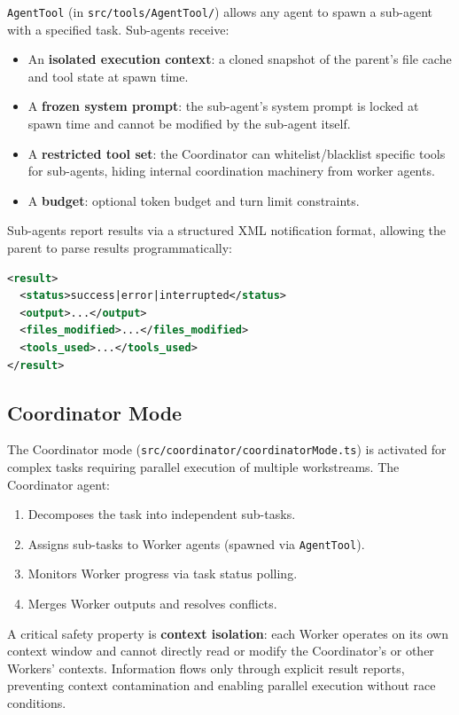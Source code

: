\documentclass{article}
\begin{document}
\texttt{AgentTool} (in \texttt{src/tools/AgentTool/}) allows any agent to spawn a sub-agent with a specified task. Sub-agents receive:
\begin{itemize}
  \item An \textbf{isolated execution context}: a cloned snapshot of the parent's file cache and tool state at spawn time.
  \item A \textbf{frozen system prompt}: the sub-agent's system prompt is locked at spawn time and cannot be modified by the sub-agent itself.
  \item A \textbf{restricted tool set}: the Coordinator can whitelist/blacklist specific tools for sub-agents, hiding internal coordination machinery from worker agents.
  \item A \textbf{budget}: optional token budget and turn limit constraints.
\end{itemize}

Sub-agents report results via a structured XML notification format, allowing the parent to parse results programmatically:
\begin{lstlisting}[language=XML]
<result>
  <status>success|error|interrupted</status>
  <output>...</output>
  <files_modified>...</files_modified>
  <tools_used>...</tools_used>
</result>
\end{lstlisting}

\subsection{Coordinator Mode}

The Coordinator mode (\texttt{src/coordinator/coordinatorMode.ts}) is activated for complex tasks requiring parallel execution of multiple workstreams. The Coordinator agent:
\begin{enumerate}
  \item Decomposes the task into independent sub-tasks.
  \item Assigns sub-tasks to Worker agents (spawned via \texttt{AgentTool}).
  \item Monitors Worker progress via task status polling.
  \item Merges Worker outputs and resolves conflicts.
\end{enumerate}

A critical safety property is \textbf{context isolation}: each Worker operates on its own context window and cannot directly read or modify the Coordinator's or other Workers' contexts. Information flows only through explicit result reports, preventing context contamination and enabling parallel execution without race conditions.
\end{document}
